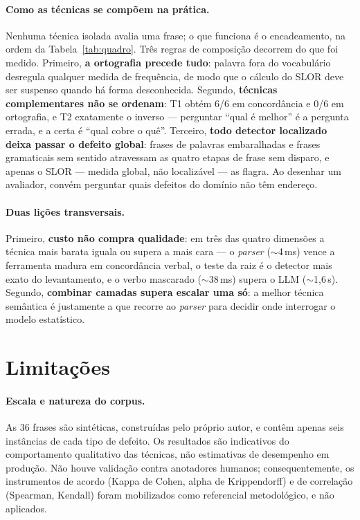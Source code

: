 \documentclass[11pt,a4paper]{article}
\begin{document}
\paragraph{Como as técnicas se compõem na prática.} Nenhuma técnica isolada avalia uma frase; o que
funciona é o encadeamento, na ordem da Tabela~\ref{tab:quadro}. Três regras de composição decorrem
do que foi medido. Primeiro, \textbf{a ortografia precede tudo}: palavra fora do vocabulário
desregula qualquer medida de frequência, de modo que o cálculo do SLOR deve ser suspenso quando há
forma desconhecida. Segundo, \textbf{técnicas complementares não se ordenam}: T1 obtém 6/6 em
concordância e 0/6 em ortografia, e T2 exatamente o inverso --- perguntar ``qual é melhor'' é a
pergunta errada, e a certa é ``qual cobre o quê''. Terceiro, \textbf{todo detector localizado deixa
passar o defeito global}: frases de palavras embaralhadas e frases gramaticais sem sentido
atravessam as quatro etapas de frase sem disparo, e apenas o SLOR --- medida global, não localizável
--- as flagra. Ao desenhar um avaliador, convém perguntar quais defeitos do domínio não têm
endereço.

\paragraph{Duas lições transversais.} Primeiro, \textbf{custo não compra qualidade}: em três das
quatro dimensões a técnica mais barata iguala ou supera a mais cara --- o \textit{parser}
($\sim$4\,ms) vence a ferramenta madura em concordância verbal, o teste da raiz é o detector mais
exato do levantamento, e o verbo mascarado ($\sim$38\,ms) supera o LLM ($\sim$1,6\,s). Segundo,
\textbf{combinar camadas supera escalar uma só}: a melhor técnica semântica é justamente a que
recorre ao \textit{parser} para decidir onde interrogar o modelo estatístico.

\section{Limitações}

\paragraph{Escala e natureza do corpus.} As 36 frases são sintéticas, construídas pelo próprio
autor, e contêm apenas seis instâncias de cada tipo de defeito. Os resultados são indicativos do
comportamento qualitativo das técnicas, não estimativas de desempenho em produção. Não houve
validação contra anotadores humanos; consequentemente, os instrumentos de acordo (Kappa de Cohen,
alpha de Krippendorff) e de correlação (Spearman, Kendall) foram mobilizados como referencial
metodológico, e não aplicados.
\end{document}
